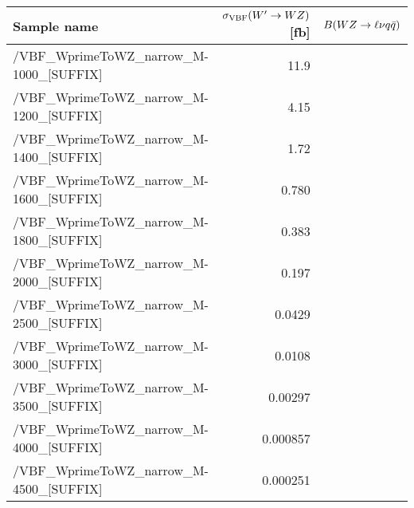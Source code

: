 \footnotesize
\begin{tabular}{lrr}
  \hline
  \textbf{Sample name} & $\sigma_{\mathrm{VBF}}(W'\to WZ)$ [fb] & $B(WZ\to\ell\nu q\bar{q})$ \\
  \hline
  \ttfamily/VBF\_WprimeToWZ\_narrow\_M-1000\_[SUFFIX] & 11.9  \\
  \ttfamily/VBF\_WprimeToWZ\_narrow\_M-1200\_[SUFFIX] & 4.15  \\
  \ttfamily/VBF\_WprimeToWZ\_narrow\_M-1400\_[SUFFIX] & 1.72  \\
  \ttfamily/VBF\_WprimeToWZ\_narrow\_M-1600\_[SUFFIX] & 0.780  \\
  \ttfamily/VBF\_WprimeToWZ\_narrow\_M-1800\_[SUFFIX] & 0.383  \\
  \ttfamily/VBF\_WprimeToWZ\_narrow\_M-2000\_[SUFFIX] & 0.197  \\
  \ttfamily/VBF\_WprimeToWZ\_narrow\_M-2500\_[SUFFIX] & 0.0429  \\
  \ttfamily/VBF\_WprimeToWZ\_narrow\_M-3000\_[SUFFIX] & 0.0108  \\
  \ttfamily/VBF\_WprimeToWZ\_narrow\_M-3500\_[SUFFIX] & 0.00297  \\
  \ttfamily/VBF\_WprimeToWZ\_narrow\_M-4000\_[SUFFIX] & 0.000857  \\
  \ttfamily/VBF\_WprimeToWZ\_narrow\_M-4500\_[SUFFIX] & 0.000251  \\
  \hline
\end{tabular}
